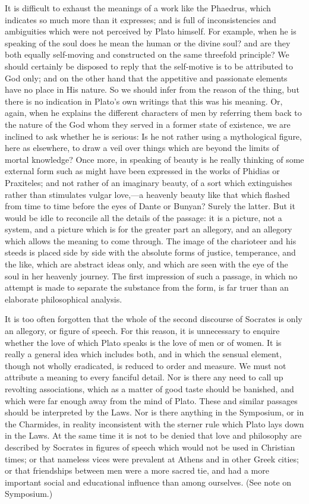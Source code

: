 \documentclass[11pt,letter]{article}
\begin{document}
\par  It is difficult to exhaust the meanings of a work like the Phaedrus, which indicates so much more than it expresses; and is full of inconsistencies and ambiguities which were not perceived by Plato himself. For example, when he is speaking of the soul does he mean the human or the divine soul? and are they both equally self-moving and constructed on the same threefold principle? We should certainly be disposed to reply that the self-motive is to be attributed to God only; and on the other hand that the appetitive and passionate elements have no place in His nature. So we should infer from the reason of the thing, but there is no indication in Plato's own writings that this was his meaning. Or, again, when he explains the different characters of men by referring them back to the nature of the God whom they served in a former state of existence, we are inclined to ask whether he is serious: Is he not rather using a mythological figure, here as elsewhere, to draw a veil over things which are beyond the limits of mortal knowledge? Once more, in speaking of beauty is he really thinking of some external form such as might have been expressed in the works of Phidias or Praxiteles; and not rather of an imaginary beauty, of a sort which extinguishes rather than stimulates vulgar love,—a heavenly beauty like that which flashed from time to time before the eyes of Dante or Bunyan? Surely the latter. But it would be idle to reconcile all the details of the passage: it is a picture, not a system, and a picture which is for the greater part an allegory, and an allegory which allows the meaning to come through. The image of the charioteer and his steeds is placed side by side with the absolute forms of justice, temperance, and the like, which are abstract ideas only, and which are seen with the eye of the soul in her heavenly journey. The first impression of such a passage, in which no attempt is made to separate the substance from the form, is far truer than an elaborate philosophical analysis.

\par  It is too often forgotten that the whole of the second discourse of Socrates is only an allegory, or figure of speech. For this reason, it is unnecessary to enquire whether the love of which Plato speaks is the love of men or of women. It is really a general idea which includes both, and in which the sensual element, though not wholly eradicated, is reduced to order and measure. We must not attribute a meaning to every fanciful detail. Nor is there any need to call up revolting associations, which as a matter of good taste should be banished, and which were far enough away from the mind of Plato. These and similar passages should be interpreted by the Laws. Nor is there anything in the Symposium, or in the Charmides, in reality inconsistent with the sterner rule which Plato lays down in the Laws. At the same time it is not to be denied that love and philosophy are described by Socrates in figures of speech which would not be used in Christian times; or that nameless vices were prevalent at Athens and in other Greek cities; or that friendships between men were a more sacred tie, and had a more important social and educational influence than among ourselves. (See note on Symposium.)
\end{document}
